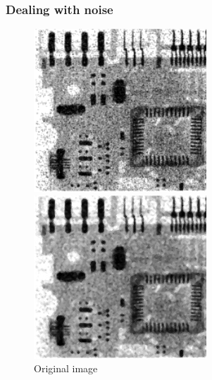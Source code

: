 \documentclass[notheorems, serif, table, compress]{beamer}  %
\begin{document}
\begin{frame}
\frametitle{Dealing with noise}
  \begin{figure}
            \begin{minipage}[t]{0.3\linewidth}
            \centering
            
            \includegraphics[width=1\linewidth]{medium.png} 
\caption{Original image}
            \end{minipage}
            \begin{minipage}[t]{0.3\linewidth}
            \centering
            
            \includegraphics[width=1\linewidth]{medout.jpg} 
            

\end{minipage}
\end{figure}
\end{frame}
\end{document}
